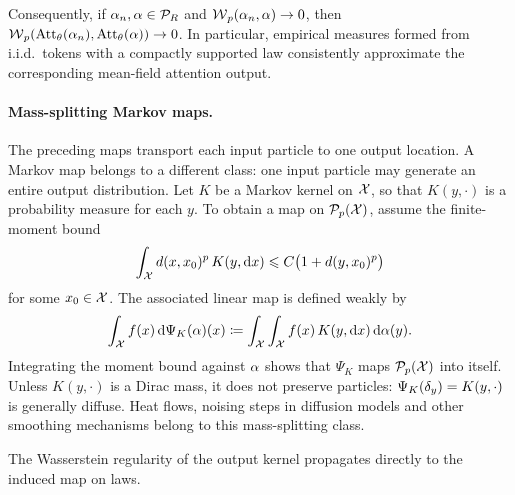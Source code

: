 Consequently, if \(\alpha_n,\alpha\in\mathcal P_R\) and \(\operatorname{\mathcal{W}}_p(\alpha_n,\alpha)\to0\), then \(\operatorname{\mathcal{W}}_p(\operatorname{Att}_\theta(\alpha_n),\operatorname{Att}_\theta(\alpha))\to0\). In particular, empirical measures formed from i.i.d.\ tokens with a compactly supported law consistently approximate the corresponding mean-field attention output.

\paragraph{Mass-splitting Markov maps.}

The preceding maps transport each input particle to one output location. A Markov map belongs to a different class: one input particle may generate an entire output distribution. Let $K$ be a Markov kernel on $\mathcal{X}$, so that $K(y,\cdot)$ is a probability measure for each $y$. To obtain a map on $\mathcal{P}_p(\mathcal{X})$, assume the finite-moment bound
\[
	\int_{\mathcal{X}} d(x,x_0)^p\,K(y,\mathrm{d} x)
	\leqslant C\bigl(1+d(y,x_0)^p\bigr)
\]
for some $x_0\in\mathcal{X}$. The associated linear map is defined weakly by
\begin{equation}\label{eq-measure-map-markov-kernel}
	\int_{\mathcal{X}} f(x)\,\mathrm{d}\Psi_K(\alpha)(x)
	\coloneqq
	\int_{\mathcal{X}}\int_{\mathcal{X}} f(x)\,K(y,\mathrm{d} x)\,\mathrm{d}\alpha(y).
\end{equation}
Integrating the moment bound against $\alpha$ shows that $\Psi_K$ maps $\mathcal{P}_p(\mathcal{X})$ into itself. Unless $K(y,\cdot)$ is a Dirac mass, it does not preserve particles: $\Psi_K(\delta_y)=K(y,\cdot)$ is generally diffuse. Heat flows, noising steps in diffusion models and other smoothing mechanisms belong to this mass-splitting class.

The Wasserstein regularity of the output kernel propagates directly to the induced map on laws.

